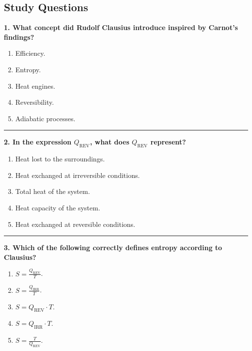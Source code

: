 \documentclass[
  9pt,
]{extbook}
\providecommand{\tightlist}{%
  \setlength{\itemsep}{0pt}\setlength{\parskip}{0pt}}
\theoremstyle{definition}
\theoremstyle{definition}
\theoremstyle{definition}
\theoremstyle{remark}
\begin{document}
\hypertarget{quest6}{%
\subsection{Study Questions}\label{quest6}}

\textbf{1. What concept did Rudolf Clausius introduce inspired by Carnot's findings?}

\begin{enumerate}
\def\labelenumi{\alph{enumi}.}
\tightlist
\item
  Efficiency.
\item
  Entropy.
\item
  Heat engines.
\item
  Reversibility.
\item
  Adiabatic processes.
\end{enumerate}

\begin{center}\rule{0.5\linewidth}{0.5pt}\end{center}

\textbf{2. In the expression \(Q_{\text{REV}}\), what does \(Q_{\text{REV}}\) represent?}

\begin{enumerate}
\def\labelenumi{\alph{enumi}.}
\tightlist
\item
  Heat lost to the surroundings.
\item
  Heat exchanged at irreversible conditions.
\item
  Total heat of the system.
\item
  Heat capacity of the system.
\item
  Heat exchanged at reversible conditions.
\end{enumerate}

\begin{center}\rule{0.5\linewidth}{0.5pt}\end{center}

\textbf{3. Which of the following correctly defines entropy according to Clausius?}

\begin{enumerate}
\def\labelenumi{\alph{enumi}.}
\tightlist
\item
  \(S = \frac{Q_{\text{REV}}}{T}\).
\item
  \(S = \frac{Q_{\text{IRR}}}{T}\).
\item
  \(S = Q_{\text{REV}} \cdot T\).
\item
  \(S = Q_{\text{IRR}} \cdot T\).
\item
  \(S = \frac{T}{Q_{\text{REV}}}\).
\end{enumerate}
\end{document}
